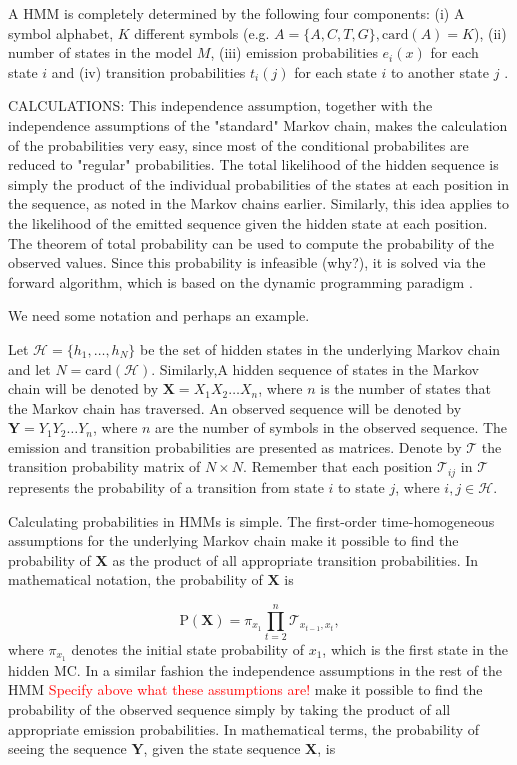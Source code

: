 \documentclass{article}
\begin{document}
A HMM is completely determined by the following four components: (i) A symbol alphabet, $K$ different symbols (e.g. $A = \{A, C, T, G\}, \text{card}(A) = K$), (ii) number of states in the model $M$, (iii) emission probabilities $e_i(x)$ for each state $i$ and (iv) transition probabilities $t_i(j)$ for each state $i$ to another state $j$ \cite{Eddy04}. 

CALCULATIONS: This independence assumption, together with the independence assumptions of the "standard" Markov chain, makes the calculation of the probabilities very easy, since most of the conditional probabilites are reduced to "regular" probabilities. The total likelihood of the hidden sequence is simply the product of the individual probabilities of the states at each position in the sequence, as noted in the Markov chains earlier. Similarly, this idea applies to the likelihood of the emitted sequence given the hidden state at each position. The theorem of total probability can be used to compute the probability of the observed values. Since this probability is infeasible (why?), it is solved via the forward algorithm, which is based on the dynamic programming paradigm \cite{Christianini2006}.


We need some notation and perhaps an example. 

Let $\mathcal{H} = \{h_1, \ldots, h_N\}$ be the set of hidden states in the underlying Markov chain and let $N = \text{card}(\mathcal{H})$. Similarly,A hidden sequence of states in the Markov chain will be denoted by $\mathbf{X} = X_1X_2\ldots X_n$, where $n$ is the number of states that the Markov chain has traversed. An observed sequence will be denoted by $\mathbf{Y} = Y_1Y_2\ldots Y_n$, where $n$ are the number of symbols in the observed sequence. The emission and transition probabilities are presented as matrices. Denote by $\mathcal{T}$ the transition probability matrix of $N \times N$. Remember that each position $\mathcal{T}_{ij}$ in $\mathcal{T}$ represents the probability of a transition from state $i$ to state $j$, where $i,j \in \mathcal{H}$. 


Calculating probabilities in HMMs is simple. The first-order time-homogeneous assumptions for the underlying Markov chain make it possible to find the probability of $\mathbf{X}$ as the product of all appropriate transition probabilities. In mathematical notation, the probability of $\mathbf{X}$ is

\begin{equation*}
    \text{P}(\mathbf{X}) = \pi_{x_1}\prod_{t=2}^n\mathcal{T}_{x_{t-1}, x_t}, 
\end{equation*}
where $\pi_{x_1}$ denotes the initial state probability of $x_1$, which is the first state in the hidden MC. In a similar fashion the independence assumptions in the rest of the HMM \textcolor{red}{Specify above what these assumptions are!} make it possible to find the probability of the observed sequence simply by taking the product of all appropriate emission probabilities. In mathematical terms, the probability of seeing the sequence $\mathbf{Y}$, given the state sequence $\mathbf{X}$, is 
\end{document}
